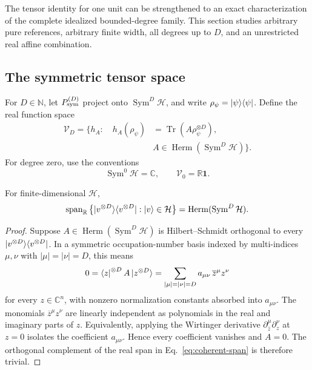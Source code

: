 \documentclass[pdflatex,sn-mathphys,NameDate,iicol]{sn-jnl}
\newcommand{\Tr}{\operatorname{Tr}}
\newcommand{\R}{\mathbb{R}}
\newcommand{\C}{\mathbb{C}}
\newcommand{\N}{\mathbb{N}}
\newcommand{\proj}[1]{\ket{#1}\!\bra{#1}}
\newcommand{\Herm}{\operatorname{Herm}}
\newcommand{\Sym}{\operatorname{Sym}}
\newcommand{\cH}{\mathcal{H}}
\newcommand{\cV}{\mathcal{V}}
\begin{document}
The tensor identity for one unit can be strengthened to an exact
characterization of the complete idealized bounded-degree family. This
section studies arbitrary pure references, arbitrary finite width, all
degrees up to $D$, and an unrestricted real affine combination.

\subsection{The symmetric tensor space}

For $D\in\N$, let $P_{\rm sym}^{(D)}$ project onto
$\Sym^D\cH$, and write $\rho_\psi=\proj\psi$. Define the real function
space
\begin{equation}
  \begin{aligned}
  \cV_D=\bigl\{h_A:\quad
    h_A(\rho_\psi)
    &=\Tr\!\left(A\rho_\psi^{\otimes D}\right),\\[-1mm]
    &A\in\Herm(\Sym^D\cH)\bigr\}.
  \end{aligned}
  \label{eq:VD-definition}
\end{equation}
For degree zero, use the conventions
\begin{equation}
  \Sym^0\cH=\C,
  \qquad
  \cV_0=\R\mathbf{1}.
  \label{eq:degree-zero-convention}
\end{equation}

\begin{lemma}
\label{lem:coherent-span}
For finite-dimensional $\cH$,
\begin{equation}
  \operatorname{span}_{\R}
  \left\{
    \proj{v^{\otimes D}}:\ket v\in\cH
  \right\}
  =
  \Herm(\Sym^D\cH).
  \label{eq:coherent-span}
\end{equation}
\end{lemma}

\begin{proof}
Suppose $A\in\Herm(\Sym^D\cH)$ is Hilbert--Schmidt orthogonal to every
$\proj{v^{\otimes D}}$. In a symmetric occupation-number basis indexed by
multi-indices $\mu,\nu$ with $|\mu|=|\nu|=D$, this means
\begin{equation}
  0=
  \bra z^{\otimes D}A\ket{z^{\otimes D}}
  =
  \sum_{|\mu|=|\nu|=D}
  a_{\mu\nu}\,\overline z^{\mu}z^\nu
  \label{eq:multiindex-polynomial}
\end{equation}
for every $z\in\C^n$, with nonzero normalization constants absorbed into
$a_{\mu\nu}$. The monomials
$\overline z^\mu z^\nu$ are linearly independent as polynomials in the
real and imaginary parts of $z$. Equivalently, applying the Wirtinger
derivative
$\partial_{\overline z}^{\mu}\partial_z^\nu$ at $z=0$ isolates the
coefficient $a_{\mu\nu}$. Hence every coefficient vanishes and $A=0$.
The orthogonal complement of the real span in
Eq.~\eqref{eq:coherent-span} is therefore trivial.
\end{proof}
\end{document}
